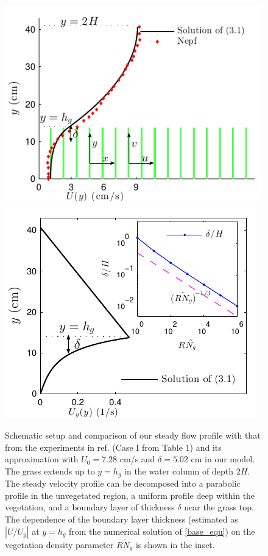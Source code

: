 \documentclass{jfm}
\newcommand{\hg}{h_g}
\renewcommand{\Rey}{{R}}
\newcommand{\Ndg}{\tilde{N}_g}
\newcommand{\ReyNdg}{{\Rey\Ndg}}
\begin{document}
\begin{figure}
\centerline{\includegraphics[scale=.99]{Grass_Base_Nepf_shear} \includegraphics{Grass_Base_Nepf_shear_scale} }
\caption{
Schematic setup and comparison of our steady flow profile with that from the experiments in ref. \cite{Nepf04} (Case I from Table 1) %
 and its approximation with $U_0=7.28$ cm/s and $\delta = 5.02$ cm in our model. The grass extends up to $y=\hg$ in the water column of depth $2H$. 
The steady velocity profile can be decomposed into a parabolic profile in the unvegetated region, a uniform profile deep within the vegetation, and a boundary layer of thickness $\delta$ near the grass top. 
The dependence of the boundary layer thickness (estimated as $|U/U_y|$ at $y=\hg$ from the numerical solution of \eqref{base_equ}) on the vegetation density parameter $\ReyNdg$ is shown in the inset.
}
\label{basicflow}
\end{figure}
\end{document}
